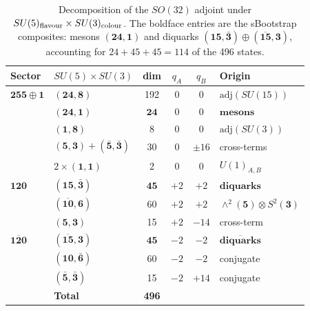 \documentclass[12pt,a4paper]{article}
\begin{document}
\begin{table}[ht]
\centering
\small
\begin{tabular}{llcccl}
\toprule
Sector & $SU(5)\times SU(3)$ & dim & $q_A$ & $q_B$ & Origin \\
\midrule
$\mathbf{255}\!\oplus\!\mathbf{1}$
 & $(\mathbf{24},\mathbf{8})$ & 192 & 0 & 0
   & $\mathrm{adj}(SU(15))$ \\
 & $\boldsymbol{(24,1)}$ & $\boldsymbol{24}$ & 0 & 0
   & $\boldsymbol{\textbf{mesons}}$ \\
 & $(\mathbf{1},\mathbf{8})$ & 8 & 0 & 0
   & $\mathrm{adj}(SU(3))$ \\
 & $(\mathbf{5},\mathbf{3})\!+\!(\bar{\mathbf{5}},\bar{\mathbf{3}})$
   & 30 & 0 & $\pm 16$ & cross-terms \\
 & $2\times(\mathbf{1},\mathbf{1})$ & 2 & 0 & 0
   & $U(1)_{A,B}$ \\
\midrule
$\mathbf{120}$
 & $\boldsymbol{(15,\bar{3})}$ & $\boldsymbol{45}$ & $+2$ & $+2$
   & $\boldsymbol{\textbf{diquarks}}$ \\
 & $(\overline{\mathbf{10}},\mathbf{6})$ & 60 & $+2$ & $+2$
   & $\wedge^2(\mathbf{5})\otimes S^2(\mathbf{3})$ \\
 & $(\mathbf{5},\mathbf{3})$ & 15 & $+2$ & $-14$
   & cross-term \\
\midrule
$\overline{\mathbf{120}}$
 & $\boldsymbol{(\overline{15},3)}$ & $\boldsymbol{45}$ & $-2$ & $-2$
   & $\boldsymbol{\overline{\textbf{diquarks}}}$ \\
 & $(\mathbf{10},\bar{\mathbf{6}})$ & 60 & $-2$ & $-2$
   & conjugate \\
 & $(\bar{\mathbf{5}},\bar{\mathbf{3}})$ & 15 & $-2$ & $+14$
   & conjugate \\
\midrule
 & \textbf{Total} & \textbf{496} & & & \\
\bottomrule
\end{tabular}
\caption{Decomposition of the $SO(32)$ adjoint under
$SU(5)_{\rm flavour} \times SU(3)_{\rm colour}$.  The boldface
entries are the sBootstrap composites: mesons
$(\mathbf{24},\mathbf{1})$ and diquarks
$(\mathbf{15},\bar{\mathbf{3}}) \oplus
(\overline{\mathbf{15}},\mathbf{3})$, accounting for
$24 + 45 + 45 = 114$ of the 496 states.}
\label{tab:496}
\end{table}
\end{document}
